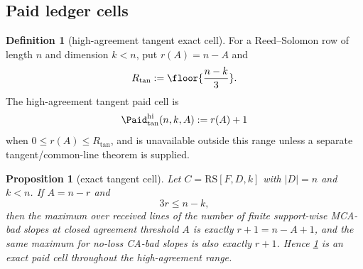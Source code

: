 \documentclass[11pt]{article}
\newtheorem{proposition}[proposition]{Proposition}
\theoremstyle{definition}
\newtheorem{definition}[definition]{Definition}
\theoremstyle{remark}
\newcommand{\RS}{\mathrm{RS}}
\begin{document}
\subsection{Paid ledger cells}

\begin{definition}[high-agreement tangent exact cell]\label{def:capf-tangent-cell}
For a Reed--Solomon row of length $n$ and dimension $k<n$, put $r(A)=n-A$ and
\[
        R_{\tan}:=\floor{\frac{n-k}{3}}.
\]
The high-agreement tangent paid cell is
\[
        \Paid_{\tan}^{\mathrm{hi}}(n,k,A):=r(A)+1
\]
when $0\le r(A)\le R_{\tan}$, and is unavailable outside this range unless a separate tangent/common-line theorem is supplied.
\end{definition}

\begin{proposition}[exact tangent cell]\label{prop:capf-tangent}
Let $C=\RS[F,D,k]$ with $|D|=n$ and $k<n$.  If $A=n-r$ and
\[
        3r\le n-k,
\]
then the maximum over received lines of the number of finite support-wise MCA-bad slopes at closed agreement threshold $A$ is exactly $r+1=n-A+1$, and the same maximum for no-loss CA-bad slopes is also exactly $r+1$.  Hence \cref{def:capf-tangent-cell} is an exact paid cell throughout the high-agreement range.
\end{proposition}
\end{document}
